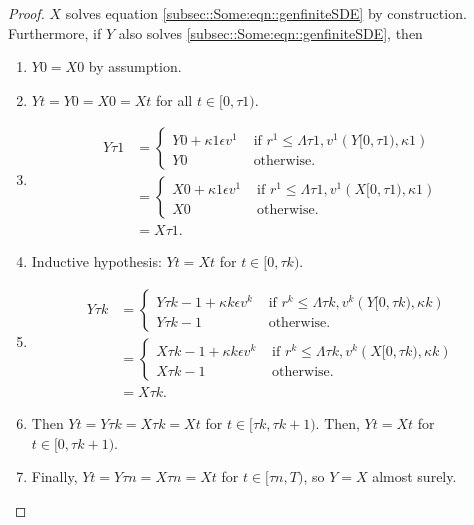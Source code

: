 \documentclass[12pt]{article}
\newcommand{\te}{\text}
\newcommand{\ep}{\epsilon}
\renewcommand{\v}{v}							%
\newcommand{\ev}{\ep}							%
\newcommand{\T}{T}								%
\renewcommand{\t}{t}							%
\newcommand{\X}{X}								%
\renewcommand{\r}{r}							%
\newcommand{\XX}{Y}								%
\newcommand{\rt}{\tau}							%
\renewcommand{\it}{k}							%
\renewcommand{\mark}{\kappa}					%
\newcommand{\ratee}{\Lambda}					%
\begin{document}
\begin{proof}
\(\X{}{}\) solves equation \eqref{subsec::Some:eqn::genfiniteSDE} by construction. Furthermore, if \(\XX{}{}\) also solves \eqref{subsec::Some:eqn::genfiniteSDE}, then 

\begin{enumerate}
\item \(\XX{}{0} = \X{}{0}\) by assumption.

\item \(\XX{}{\t} = \XX{}{0} = \X{}{0} = \X{}{\t}\) for all \(\t\in [0,\rt{1})\).

\item 

\begin{align*}
\XX{}{\rt{1}} &= \begin{cases}
\XX{}{0} + \mark{1}\ev{\v^1} &\te{ if } \r^1 \leq \ratee{\rt{1},\v^1}(\XX{}{[0,\rt{1})},\mark{1})\\
\XX{}{0} &\te{ otherwise.}
\end{cases}\\
&= \begin{cases}
\X{}{0} + \mark{1}\ev{\v^1} &\te{ if } \r^1 \leq \ratee{\rt{1},\v^1}(\X{}{[0,\rt{1})},\mark{1})\\
\X{}{0} &\te{ otherwise.}
\end{cases}\\
&= \X{}{\rt{1}}.
\end{align*}

\item Inductive hypothesis: \(\XX{}{\t} = \X{}{\t}\) for \(\t\in [0,\rt{\it})\). 

\item 

\begin{align*}
\XX{}{\rt{\it}} &= \begin{cases}
\XX{}{\rt{\it-1}} + \mark{\it}\ev{\v^\it} &\te{ if } \r^\it \leq \ratee{\rt{\it},\v^\it}(\XX{}{[0,\rt{\it})},\mark{\it})\\
\XX{}{\rt{\it-1}} &\te{ otherwise.}
\end{cases}\\
&= \begin{cases}
\X{}{\rt{\it-1}} + \mark{\it}\ev{\v^\it} &\te{ if } \r^\it \leq \ratee{\rt{\it},\v^\it}(\X{}{[0,\rt{\it})},\mark{\it})\\
\X{}{\rt{\it-1}} &\te{ otherwise.}
\end{cases}\\
&= \X{}{\rt{\it}}.
\end{align*}

\item Then \(\XX{}{\t} = \XX{}{\rt{\it}} = \X{}{\rt{\it}} = \X{}{\t}\) for \(\t \in [\rt{\it},\rt{\it+1})\). Then, \(\XX{}{\t} = \X{}{\t}\) for \(\t\in [0,\rt{\it+1})\).

\item Finally, \(\XX{}{\t} = \XX{}{\rt{n}} = \X{}{\rt{n}} = \X{}{\t}\) for \(\t\in [\rt{n},\T)\), so \(\XX{}{} = \X{}{}\) almost surely.
\end{enumerate}
\end{proof}
\end{document}
